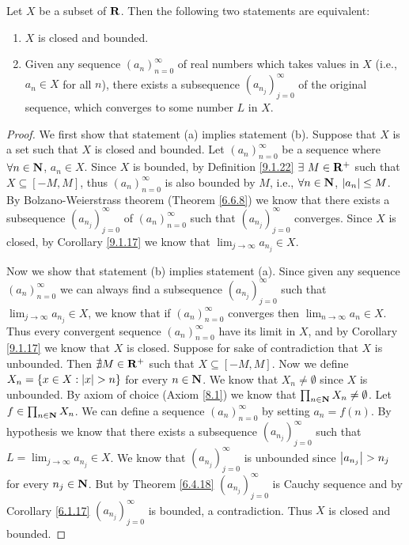 \begin{theorem}\label{9.1.24}
    Let \(X\) be a subset of \(\mathbf{R}\).
    Then the following two statements are equivalent:
    \begin{enumerate}
        \item \(X\) is closed and bounded.
        \item Given any sequence \((a_n)_{n = 0}^\infty\) of real numbers which takes values in \(X\) (i.e., \(a_n \in X\) for all \(n\)), there exists a subsequence \((a_{n_j})_{j = 0}^\infty\) of the original sequence, which converges to some number \(L\) in \(X\).
    \end{enumerate}
\end{theorem}

\begin{proof}
    We first show that statement (a) implies statement (b).
    Suppose that \(X\) is a set such that \(X\) is closed and bounded.
    Let \((a_n)_{n = 0}^\infty\) be a sequence where \(\forall n \in \mathbf{N}\), \(a_n \in X\).
    Since \(X\) is bounded, by Definition \ref{9.1.22} \(\exists\ M \in \R^+\) such that \(X \subseteq [-M, M]\), thus \((a_n)_{n = 0}^\infty\) is also bounded by \(M\), i.e., \(\forall n \in \mathbf{N}\), \(\left\lvert a_n\right\rvert \leq M\).
    By Bolzano-Weierstrass theorem (Theorem \ref{6.6.8}) we know that there exists a subsequence \((a_{n_j})_{j = 0}^\infty\) of \((a_n)_{n = 0}^\infty\) such that \((a_{n_j})_{j = 0}^\infty\) converges.
    Since \(X\) is closed, by Corollary \ref{9.1.17} we know that \(\lim_{j \to \infty} a_{n_j} \in X\).

    Now we show that statement (b) implies statement (a).
    Since given any sequence \((a_n)_{n = 0}^\infty\) we can always find a subsequence \((a_{n_j})_{j = 0}^\infty\) such that \(\lim_{j \to \infty} a_{n_j} \in X\), we know that if \((a_n)_{n = 0}^\infty\) converges then \(\lim_{n \to \infty} a_n \in X\).
    Thus every convergent sequence \((a_n)_{n = 0}^\infty\) have its limit in \(X\), and by Corollary \ref{9.1.17} we know that \(X\) is closed.
    Suppose for sake of contradiction that \(X\) is unbounded.
    Then \(\nexists M \in \mathbf{R}^+\) such that \(X \subseteq [-M, M]\).
    Now we define \(X_n = \{x \in X : \left\lvert x\right\rvert > n\}\) for every \(n \in \mathbf{N}\).
    We know that \(X_n \neq \emptyset\) since \(X\) is unbounded.
    By axiom of choice (Axiom \ref{8.1}) we know that \(\prod_{n \in \mathbf{N}} X_n \neq \emptyset\).
    Let \(f \in \prod_{n \in \mathbf{N}} X_n\).
    We can define a sequence \((a_n)_{n = 0}^\infty\) by setting \(a_n = f(n)\).
    By hypothesis we know that there exists a subsequence \((a_{n_j})_{j = 0}^\infty\) such that \(L = \lim_{j \to \infty} a_{n_j} \in X\).
    We know that \((a_{n_j})_{j = 0}^\infty\) is unbounded since \(\left\lvert a_{n_j}\right\rvert > n_j\) for every \(n_j \in \mathbf{N}\).
    But by Theorem \ref{6.4.18} \((a_{n_j})_{j = 0}^\infty\) is Cauchy sequence and by Corollary \ref{6.1.17} \((a_{n_j})_{j = 0}^\infty\) is bounded, a contradiction.
    Thus \(X\) is closed and bounded.
\end{proof}


